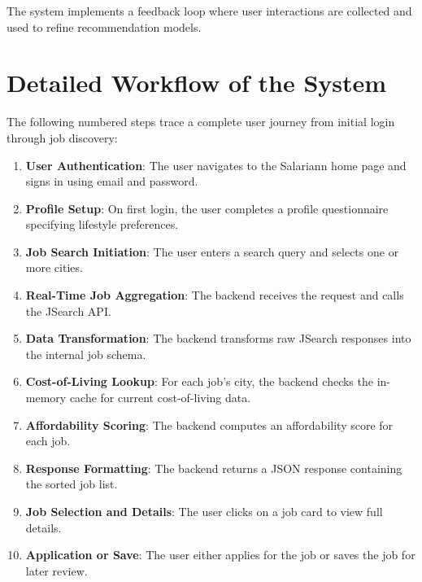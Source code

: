 The system implements a feedback loop where user interactions are collected and used to refine recommendation models.

\section{Detailed Workflow of the System}

The following numbered steps trace a complete user journey from initial login through job discovery:

\begin{enumerate}
    \item \textbf{User Authentication}: The user navigates to the Salariann home page and signs in using email and password.
    
    \item \textbf{Profile Setup}: On first login, the user completes a profile questionnaire specifying lifestyle preferences.
    
    \item \textbf{Job Search Initiation}: The user enters a search query and selects one or more cities.
    
    \item \textbf{Real-Time Job Aggregation}: The backend receives the request and calls the JSearch API.
    
    \item \textbf{Data Transformation}: The backend transforms raw JSearch responses into the internal job schema.
    
    \item \textbf{Cost-of-Living Lookup}: For each job's city, the backend checks the in-memory cache for current cost-of-living data.
    
    \item \textbf{Affordability Scoring}: The backend computes an affordability score for each job.
    
    \item \textbf{Response Formatting}: The backend returns a JSON response containing the sorted job list.
    
    \item \textbf{Job Selection and Details}: The user clicks on a job card to view full details.
    
    \item \textbf{Application or Save}: The user either applies for the job or saves the job for later review.
\end{enumerate}

